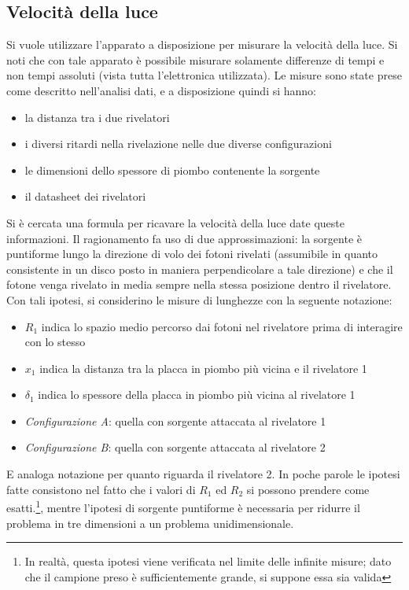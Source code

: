 \subsection{Velocità della luce}

Si vuole utilizzare l'apparato a disposizione per misurare la velocità della luce. Si noti che con tale apparato è possibile misurare solamente differenze di tempi
e non tempi assoluti (vista tutta l'elettronica utilizzata). Le misure sono state prese come descritto nell'analisi dati, e a disposizione quindi si hanno:
\begin{itemize}
\item la distanza tra i due rivelatori
\item i diversi ritardi nella rivelazione nelle due diverse configurazioni
\item le dimensioni dello spessore di piombo contenente la sorgente
\item il datasheet dei rivelatori
\end{itemize}
Si è cercata una formula per ricavare la velocità della luce date queste informazioni. Il ragionamento fa uso di due approssimazioni: la sorgente è puntiforme lungo la direzione
di volo dei fotoni rivelati (assumibile in quanto consistente in un disco posto in maniera perpendicolare a tale direzione)
e che il fotone venga rivelato in media sempre nella stessa posizione dentro il rivelatore.\\

Con tali ipotesi, si considerino le misure di lunghezze con la seguente notazione:
\begin{itemize}
\item $R_1$ indica lo spazio medio percorso dai fotoni nel rivelatore prima di interagire con lo stesso
\item $x_1$ indica la distanza tra la placca in piombo più vicina e il rivelatore 1
\item $\delta_1$ indica lo spessore della placca in piombo più vicina al rivelatore 1
\item \textit{Configurazione A}: quella con sorgente attaccata al rivelatore 1
\item \textit{Configurazione B}: quella con sorgente attaccata al rivelatore 2
\end{itemize}
E analoga notazione per quanto riguarda il rivelatore 2. In poche parole le ipotesi fatte consistono nel fatto che i valori di $R_1$ ed $R_2$ si possono prendere
come esatti.\footnote{In realtà, questa ipotesi viene verificata nel limite delle infinite misure; dato che il campione preso è sufficientemente grande, si suppone essa sia
valida}, mentre l'ipotesi di sorgente puntiforme è necessaria per ridurre il problema in tre dimensioni a un problema unidimensionale.\\


